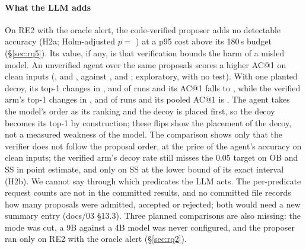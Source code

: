 \paragraph{What the LLM adds}
On RE2 with the oracle alert, the code-verified proposer adds no detectable accuracy (H2a; Holm-adjusted $p = $ ) at a p95 cost above its 180\,s budget (\S\ref{sec:rq5}).
Its value, if any, is that verification bounds the harm of a misled model.
An unverified agent over the same proposals scores a higher AC@1 on clean inputs (,  and , against ,  and ; exploratory, with no test).
With one planted decoy, its top-1 changes in ,  and  of runs and its AC@1 falls to , while the verified arm's top-1 changes in ,  and  of runs and its pooled AC@1 is .
The agent takes the model's order as its ranking and the decoy is placed first, so the decoy becomes its top-1 by construction; these flips show the placement of the decoy, not a measured weakness of the model.
The comparison shows only that the verifier does not follow the proposal order, at the price of the agent's accuracy on clean inputs; the verified arm's decoy rate still misses the 0.05 target on OB and SS in point estimate, and only on SS at the lower bound of its exact interval (H2b).
We cannot say through which predicates the LLM acts.
The per-predicate request counts are not in the committed results, and no committed file records how many proposals were admitted, accepted or rejected; both would need a new summary entry (docs/03 §13.3).
Three planned comparisons are also missing: the  mode was cut, a 9B against a 4B model was never configured, and the proposer ran only on RE2 with the oracle alert (\S\ref{sec:rq2}).

